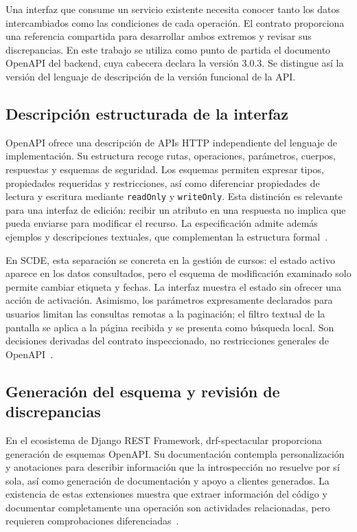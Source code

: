 Una interfaz que consume un servicio existente necesita conocer tanto los datos
intercambiados como las condiciones de cada operación. El contrato proporciona
una referencia compartida para desarrollar ambos extremos y revisar sus
discrepancias. En este trabajo se utiliza como punto de partida el documento
OpenAPI del backend, cuya cabecera declara la versión 3.0.3. Se distingue así la
versión del lenguaje de descripción de la versión funcional de la API.

\subsection{Descripción estructurada de la interfaz}

OpenAPI ofrece una descripción de APIs HTTP independiente del lenguaje de
implementación. Su estructura recoge rutas, operaciones, parámetros, cuerpos,
respuestas y esquemas de seguridad. Los esquemas permiten expresar tipos,
propiedades requeridas y restricciones, así como diferenciar propiedades de
lectura y escritura mediante \texttt{readOnly} y \texttt{writeOnly}. Esta
distinción es relevante para una interfaz de edición: recibir un atributo en
una respuesta no implica que pueda enviarse para modificar el recurso.
La especificación admite además ejemplos y descripciones textuales, que
complementan la estructura formal~\cite{codex_openapi303}.

En SCDE, esta separación se concreta en la gestión de cursos: el estado activo
aparece en los datos consultados, pero el esquema de modificación examinado
solo permite cambiar etiqueta y fechas. La interfaz muestra el estado sin
ofrecer una acción de activación. Asimismo, los parámetros expresamente
declarados para usuarios limitan las consultas remotas a la paginación; el
filtro textual de la pantalla se aplica a la página recibida y se presenta
como búsqueda local. Son decisiones derivadas del contrato inspeccionado, no
restricciones generales de OpenAPI~\cite{scde_admin_implementation_2026}.

\subsection{Generación del esquema y revisión de discrepancias}

En el ecosistema de Django REST Framework, drf-spectacular proporciona generación
de esquemas OpenAPI. Su documentación contempla personalización y anotaciones
para describir información que la introspección no resuelve por sí sola, así
como generación de documentación y apoyo a clientes generados. La existencia de
estas extensiones muestra que extraer información del código y documentar
completamente una operación son actividades relacionadas, pero requieren
comprobaciones diferenciadas~\cite{codex_drfspectacular}.

